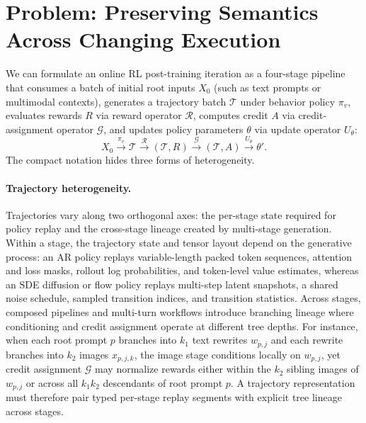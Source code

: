 \documentclass[10pt]{article}
\begin{document}
\section{Problem: Preserving Semantics Across Changing Execution}
\label{sec:problem}

We can formulate an online RL post-training iteration as a four-stage pipeline that consumes a batch of initial root inputs $X_0$ (such as text prompts or multimodal contexts), generates a trajectory batch $\mathcal{T}$ under behavior policy $\pi_v$, evaluates rewards $R$ via reward operator $\mathcal{R}$, computes credit $A$ via credit-assignment operator $\mathcal{G}$, and updates policy parameters $\theta$ via update operator $U_\theta$:
\begin{equation}
X_0 \xrightarrow{\pi_v} \mathcal{T}
  \xrightarrow{\mathcal{R}} (\mathcal{T},R)
  \xrightarrow{\mathcal{G}} (\mathcal{T},A)
  \xrightarrow{U_\theta} \theta'.
\label{eq:outer-loop}
\end{equation}
The compact notation hides three forms of heterogeneity.

\paragraph{Trajectory heterogeneity.}
Trajectories vary along two orthogonal axes: the per-stage state required for policy replay and the cross-stage lineage created by multi-stage generation.
Within a stage, the trajectory state and tensor layout depend on the generative process: an AR policy replays variable-length packed token sequences, attention and loss masks, rollout log probabilities, and token-level value estimates, whereas an SDE diffusion or flow policy replays multi-step latent snapshots, a shared noise schedule, sampled transition indices, and transition statistics.
Across stages, composed pipelines and multi-turn workflows introduce branching lineage where conditioning and credit assignment operate at different tree depths.
For instance, when each root prompt $p$ branches into $k_1$ text rewrites $w_{p,j}$ and each rewrite branches into $k_2$ images $x_{p,j,k}$, the image stage conditions locally on $w_{p,j}$, yet credit assignment $\mathcal{G}$ may normalize rewards either within the $k_2$ sibling images of $w_{p,j}$ or across all $k_1 k_2$ descendants of root prompt $p$.
A trajectory representation must therefore pair typed per-stage replay segments with explicit tree lineage across stages.
\end{document}
